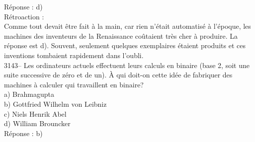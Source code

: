 \documentclass[letterpaper, 12pt]{article}
\begin{document}
R\'eponse : d)\\

R\'etroaction :\\
Comme tout devait \^etre fait \`a la main, car rien n'\'etait automatis\'e \`a l'\'epoque, les machines des inventeurs de la Renaissance co\^utaient tr\`es cher \`a produire. La r\'eponse est d). Souvent, seulement quelques exemplaires \'etaient produits et ces inventions tombaient rapidement dans l'oubli.\\



3143-- Les ordinateurs actuels effectuent leurs calculs en binaire (base 2, soit une suite successive de z\'ero et de un). \`A qui doit-on cette id\'ee de fabriquer des machines \`a calculer qui travaillent en binaire?\\

a) Brahmagupta\\
b) Gottfried Wilhelm von Leibniz\\
c) Niels Henrik Abel\\
d) William Brouncker\\

R\'eponse : b)\\
\end{document}
